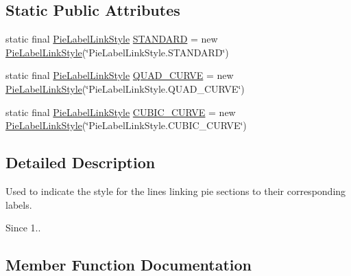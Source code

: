 \subsection*{Static Public Attributes}
\begin{DoxyCompactItemize}
\item 
static final \mbox{\hyperlink{classorg_1_1jfree_1_1chart_1_1plot_1_1_pie_label_link_style}{Pie\+Label\+Link\+Style}} \mbox{\hyperlink{classorg_1_1jfree_1_1chart_1_1plot_1_1_pie_label_link_style_a53a4e0ffd909850c6dcc01435e579179}{S\+T\+A\+N\+D\+A\+RD}} = new \mbox{\hyperlink{classorg_1_1jfree_1_1chart_1_1plot_1_1_pie_label_link_style}{Pie\+Label\+Link\+Style}}(\char`\"{}Pie\+Label\+Link\+Style.\+S\+T\+A\+N\+D\+A\+RD\char`\"{})
\item 
static final \mbox{\hyperlink{classorg_1_1jfree_1_1chart_1_1plot_1_1_pie_label_link_style}{Pie\+Label\+Link\+Style}} \mbox{\hyperlink{classorg_1_1jfree_1_1chart_1_1plot_1_1_pie_label_link_style_ac7023a1da40f426f0cec253d997a4998}{Q\+U\+A\+D\+\_\+\+C\+U\+R\+VE}} = new \mbox{\hyperlink{classorg_1_1jfree_1_1chart_1_1plot_1_1_pie_label_link_style}{Pie\+Label\+Link\+Style}}(\char`\"{}Pie\+Label\+Link\+Style.\+Q\+U\+A\+D\+\_\+\+C\+U\+R\+VE\char`\"{})
\item 
static final \mbox{\hyperlink{classorg_1_1jfree_1_1chart_1_1plot_1_1_pie_label_link_style}{Pie\+Label\+Link\+Style}} \mbox{\hyperlink{classorg_1_1jfree_1_1chart_1_1plot_1_1_pie_label_link_style_a93f18370ddd63f1766268f2478ab98b9}{C\+U\+B\+I\+C\+\_\+\+C\+U\+R\+VE}} = new \mbox{\hyperlink{classorg_1_1jfree_1_1chart_1_1plot_1_1_pie_label_link_style}{Pie\+Label\+Link\+Style}}(\char`\"{}Pie\+Label\+Link\+Style.\+C\+U\+B\+I\+C\+\_\+\+C\+U\+R\+VE\char`\"{})
\end{DoxyCompactItemize}


\subsection{Detailed Description}
Used to indicate the style for the lines linking pie sections to their corresponding labels.

\begin{DoxySince}{Since}
1.. 
\end{DoxySince}


\subsection{Member Function Documentation}
\mbox{\label{classorg_1_1jfree_1_1chart_1_1plot_1_1_pie_label_link_style_aa3ea1fec9d372d0e642b8ef86125dbf4}} 
